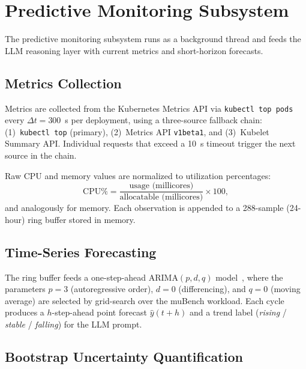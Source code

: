 \section{Predictive Monitoring Subsystem}
\label{sec:monitoring}

The predictive monitoring subsystem runs as a background thread and feeds the
LLM reasoning layer with current metrics and short-horizon forecasts.

\subsection{Metrics Collection}
\label{sec:metrics-collection}

Metrics are collected from the Kubernetes Metrics API via \texttt{kubectl top pods}
every $\Delta t = 300$~s per deployment, using a three-source fallback chain:
(1)~\texttt{kubectl top} (primary), (2)~Metrics API \texttt{v1beta1}, and
(3)~Kubelet Summary API. Individual requests that exceed a 10~s timeout trigger
the next source in the chain.

Raw CPU and memory values are normalized to utilization percentages:
\begin{equation}
  \mathrm{CPU\%} = \frac{\text{usage (millicores)}}{\text{allocatable (millicores)}}
  \times 100,
  \label{eq:cpu-norm}
\end{equation}
and analogously for memory. Each observation is appended to a 288-sample
(24-hour) ring buffer stored in memory.

\subsection{Time-Series Forecasting}
\label{sec:forecasting-impl}

The ring buffer feeds a one-step-ahead ARIMA$(p,d,q)$ model~\cite{box1970arima},
where the parameters $p=3$ (autoregressive order), $d=0$ (differencing), and
$q=0$ (moving average) are selected by grid-search over the muBench workload.
Each cycle produces a $h$-step-ahead point forecast $\hat{y}(t+h)$ and a trend
label (\textit{rising} / \textit{stable} / \textit{falling}) for the LLM prompt.

\subsection{Bootstrap Uncertainty Quantification}
\label{sec:uq}

